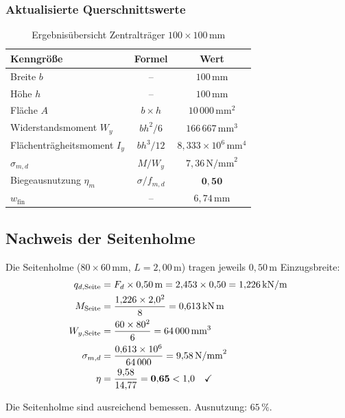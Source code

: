 ﻿\documentclass[12pt,a4paper]{article}
\theoremstyle{definition}
\theoremstyle{plain}
\theoremstyle{remark}
\begin{document}
\subsubsection{Aktualisierte Querschnittswerte}

\begin{table}[H]
\centering
\begin{tabular}{lcc}
\toprule
Kenngröße & Formel & Wert \\
\midrule
Breite $b$ & -- & $100\,\text{mm}$ \\
Höhe $h$   & -- & $100\,\text{mm}$ \\
Fläche $A$ & $b \times h$ & $10\,000\,\text{mm}^2$ \\
Widerstandsmoment $W_y$ & $b h^2 / 6$ & $166\,667\,\text{mm}^3$ \\
Flächenträgheitsmoment $I_y$ & $b h^3 / 12$ & $8{,}333 \times 10^6\,\text{mm}^4$ \\
\midrule
$\sigma_{m,d}$ & $M/W_y$ & $7{,}36\,\text{N/mm}^2$ \\
Biegeausnutzung $\eta_m$ & $\sigma/f_{m,d}$ & $\mathbf{0{,}50}$ \\
$w_{\text{fin}}$ & -- & $6{,}74\,\text{mm}$ \\
\bottomrule
\end{tabular}
\caption{Ergebnisübersicht Zentralträger $100\times100\,\text{mm}$}
\end{table}

\subsection{Nachweis der Seitenholme}

Die Seitenholme ($80 \times 60\,\text{mm}$, $L = 2{,}00\,\text{m}$) tragen
jeweils $0{,}50\,\text{m}$ Einzugsbreite:
\begin{align*}
  q_{d,\text{Seite}} &= F_d \times 0{,}50\,\text{m} = 2{,}453 \times 0{,}50 = 1{,}226\,\text{kN/m} \\
  M_{\text{Seite}}   &= \frac{1{,}226 \times 2{,}0^2}{8} = 0{,}613\,\text{kN\,m} \\
  W_{y,\text{Seite}} &= \frac{60 \times 80^2}{6} = 64\,000\,\text{mm}^3 \\
  \sigma_{m,d}       &= \frac{0{,}613 \times 10^6}{64\,000} = 9{,}58\,\text{N/mm}^2 \\
  \eta               &= \frac{9{,}58}{14{,}77} = \mathbf{0{,}65} < 1{,}0 \quad \checkmark
\end{align*}

Die Seitenholme sind ausreichend bemessen. Ausnutzung: $65\,\%$.
\end{document}
